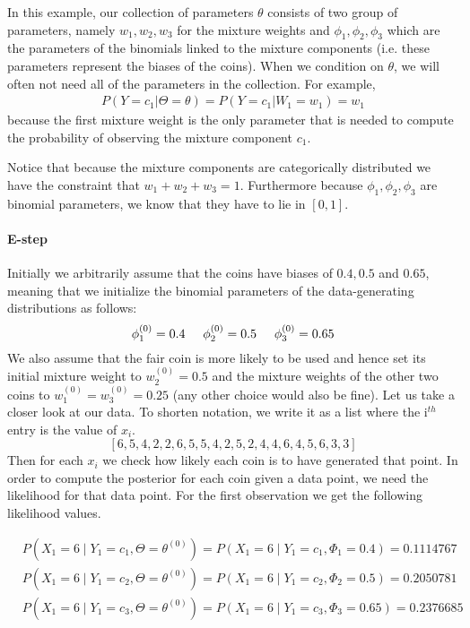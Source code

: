 \documentclass[a4paper,11pt,leqno]{report}\usepackage[]{graphicx}\usepackage[]{color}
\begin{document}
In this example, our collection of parameters $ \theta $ consists of two group of parameters, namely $ w_{1}, w_{2}, w_{3} $ for the mixture
weights and $ \phi_{1}, \phi_{2}, \phi_{3} $ which are the parameters of the binomials linked to the mixture components (i.e. these parameters
represent the biases of the coins). When we condition on $ \theta $, we will often not need all of the parameters in the collection. For example,
\begin{align*}
P(Y=c_{1}|\Theta=\theta) = P(Y=c_{1}|W_{1}=w_{1}) = w_{1}
\end{align*}
because the first mixture weight is the only parameter that is needed to compute 
the probability of observing the mixture component $ c_{1} $. 

Notice that because the mixture components are categorically distributed we have the constraint that
$ w_{1} + w_{2} + w_{3} = 1 $. Furthermore because $ \phi_{1}, \phi_{2}, \phi_{3} $ are binomial parameters, we know that they have to lie in $ [0,1] $.

\paragraph{E-step} Initially we arbitrarily assume that the coins have biases of $ 0.4, 0.5  $ and $ 0.65 $, meaning that we initialize the binomial parameters of the data-generating
distributions as follows:
\begin{equation}
\phi^{(0)}_{1} = 0.4 \hskip 0.5cm  \phi^{(0)}_{2} = 0.5 \hskip 0.5cm  \phi^{(0)}_{3} = 0.65
\end{equation}
We also assume that the fair coin is more likely to be used and hence set its initial mixture weight to $ w_2^{(0)}=0.5 $ and the mixture weights of the 
other two coins to $ w_1^{(0)}=w_3^{(0)}=0.25 $ (any other choice would also be fine). Let 
us take a closer look at our data. To shorten notation, we write it as a list where the i$ ^{th} $ entry is the value of $ x_{i} $.
$$ \left[ 6, 5, 4, 2, 2, 6, 5, 5, 4, 2, 5, 2, 4, 4, 6, 4, 5, 6, 3, 3 \right] $$ 
Then for each $ x_{i} $ we check how likely each coin is to have generated that point. In order to compute the posterior for each coin given a data point, we need
the likelihood for that data point. For the first observation we get the following likelihood values.


\begin{align}
&P(X_{1}=6 \mid Y_{1} = c_{1}, \Theta=\theta^{(0)}) = P(X_{1}=6 \mid Y_{1}=c_{1},\Phi_{1} = 0.4) = 0.1114767& \\
&P(X_{1}=6 \mid Y_{1} = c_{2}, \Theta=\theta^{(0)}) = P(X_{1}=6 \mid Y_{1}=c_{2},\Phi_{2} = 0.5) = 0.2050781& \nonumber \\ 
&P(X_{1}=6 \mid Y_{1} = c_{3}, \Theta=\theta^{(0)}) = P(X_{1}=6 \mid Y_{1}=c_{3},\Phi_{3} = 0.65) = 0.2376685& \nonumber
\end{align}
\end{document}
